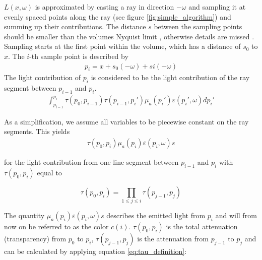 $L({x},\omega )$ is approximated by casting a ray in direction $-\omega$ and sampling it at evenly spaced points along the ray (see figure \ref{fig:simple_algorithm}) and summing up their contributions\cite{511}. The distance $s$ between the sampling points should be smaller than the volumes Nyquist limit \cite{659497}, otherwise details are missed \cite{10.1145/2661229.2661292}.
Sampling starts at the first point within the volume, which has a distance of $s_0$ to ${x}$. The $i$-th sample point is described by
\begin{align*}
p_i={x} + s_0(-\omega) + si(-\omega)
\end{align*}
The light contribution of $p_i$ is considered to be the light contribution of the ray segment between $p_{i-1}$ and $p_i$.
\begin{align*}
\int_{p_{i-1}}^{p_i} \tau (p_0,p_{i-1}) \tau(p_{i-1},p_{i}') \mu_a(p_{i}')\varepsilon (p_{i}', \omega)dp_{i}'
\end{align*} 



As a simplification, we assume all variables to be piecewise constant\cite{10.1145/147130.147155} on the ray segments. This yields
\begin{align*}
\tau(p_0, p_i) \mu_a(p_{i})\varepsilon (p_{i}, \omega)s
\end{align*} 


for the light contribution from one line segment between $p_{i-1}$ and $p_i$ with $\tau(p_0, p_i)$ equal to


\begin{equation}\label{eq:discrete_tau_approx}
\tau(p_0, p_i)=\prod_{1\le j \le i}{\tau(p_{j-1}, p_j)}
\end{equation} 



The quantity $\mu_a(p_{i})\varepsilon (p_{i}, \omega)s$ describes the emitted light from $p_i$ and will from now on be referred to as the color $c(i)$. $\tau(p_0, p_i)$ is the total attenuation (transparency) from $p_0$ to $p_i$, $\tau(p_{j-1}, p_j)$ is the attenuation from $p_{j-1}$ to $p_j$ and can be calculated by applying equation \ref{eq:tau_definition}: 


